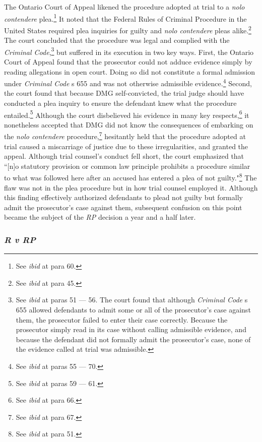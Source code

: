 The Ontario Court of Appeal likened the procedure adopted at trial to a \textit{nolo contendere} plea.\footnote{See \textit{ibid} at para 60.} It noted that the Federal Rules of Criminal Procedure in the United States required plea inquiries for guilty and \textit{nolo contendere} pleas alike.\footnote{See \textit{ibid} at para 45.} The court concluded that the procedure was legal and complied with the \textit{Criminal Code},\footnote{See \textit{ibid} at paras 51 — 56. The court found that although \textit{Criminal Code} s 655 allowed defendants to admit some or all of the prosecutor's case against them, the prosecutor failed to enter their case correctly. Because the prosecutor simply read in its case without calling admissible evidence, and because the defendant did not formally admit the prosecutor's case, none of the evidence called at trial was admissible.} but suffered in its execution in two key ways. First, the Ontario Court of Appeal found that the prosecutor could not adduce evidence simply by reading allegations in open court. Doing so did not constitute a formal admission under \textit{Criminal Code} s 655 and was not otherwise admissible evidence.\footnote{See \textit{ibid} at paras 55 — 70.} Second, the court found that because DMG self-convicted, the trial judge should have conducted a plea inquiry to ensure the defendant knew what the procedure entailed.\footnote{See \textit{ibid} at paras 59 — 61.} Although the court disbelieved his evidence in many key respects,\footnote{See \textit{ibid} at para 66.} it nonetheless accepted that DMG did not know the consequences of embarking on the \textit{nolo contendere} procedure,\footnote{See \textit{ibid} at para 67.} hesitantly held that the procedure adopted at trial caused a miscarriage of justice due to these irregularities, and granted the appeal. Although trial counsel's conduct fell short, the court emphasized that ``[n]o statutory provision or common law principle prohibits a procedure similar to what was followed here after an accused has entered a plea of not guilty."\footnote{See \textit{ibid} at para 51.} The flaw was not in the plea procedure but in how trial counsel employed it. Although this finding effectively authorized defendants to plead not guilty but formally admit the prosecutor's case against them, subsequent confusion on this point became the subject of the \textit{RP} decision a year and a half later.

\subsubsection{\textit{R v RP}}

